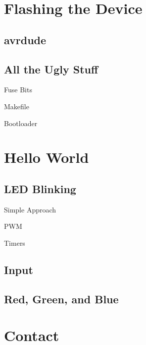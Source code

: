 \documentclass{beamer}
\begin{document}
\section{Flashing the Device}

\subsection{avrdude}

\subsection{All the Ugly Stuff}

\begin{frame}{Fuse Bits}
\end{frame}

\begin{frame}{Makefile}
\end{frame}

\begin{frame}{Bootloader}
\end{frame}

\section{Hello World}

\subsection{LED Blinking}

\begin{frame}{Simple Approach}
\end{frame}

\begin{frame}{PWM}
\end{frame}

\begin{frame}{Timers}
\end{frame}

\subsection{Input}

\subsection{Red, Green, and Blue}

\section{Contact}
\end{document}
